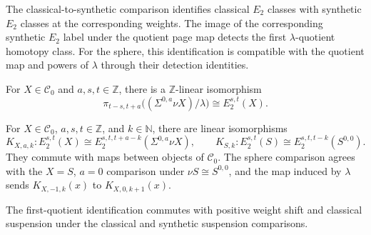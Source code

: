 \begin{definition}
\label{sem:AdamsSynthetic:e2-comparison}
The classical-to-synthetic comparison identifies classical $E_2$ classes with synthetic $E_2$ classes at the corresponding weights. The image of the corresponding synthetic $E_2$ label under the quotient page map detects the first $\lambda$-quotient homotopy class. For the sphere, this identification is compatible with the quotient map and powers of $\lambda$ through their detection identities.

For $X\in\mathcal C_0$ and $a,s,t\in\mathbb Z$, there is a $\mathbb Z$-linear isomorphism
\[
\pi_{t-s,t+a}\bigl((\Sigma^{0,a}\nu X)/\lambda\bigr)\cong E_2^{s,t}(X).
\]

For $X\in\mathcal C_0$, $a,s,t\in\mathbb Z$, and $k\in\mathbb N$, there are linear isomorphisms
\[
K_{X,a,k}\colon E_2^{s,t}(X)\cong E_2^{s,t,t+a-k}(\Sigma^{0,a}\nu X),\qquad
K_{S,k}\colon E_2^{s,t}(S)\cong E_2^{s,t,t-k}(S^{0,0}).
\]
They commute with maps between objects of $\mathcal C_0$. The sphere comparison agrees with the $X=S$, $a=0$ comparison under $\nu S\cong S^{0,0}$, and the map induced by $\lambda$ sends $K_{X,-1,k}(x)$ to $K_{X,0,k+1}(x)$.
\end{definition}


\begin{theorem}[First-quotient labels and suspension]
\label{sem:AdamsSynthetic:first-quotient-shifts}
The first-quotient identification commutes with positive weight shift and classical suspension under the classical and synthetic suspension comparisons.
\end{theorem}

